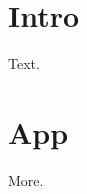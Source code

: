 \documentclass{article}
\begin{document}
\section{Intro} Text.
\appendix
\section{App} More.
\end{document}
